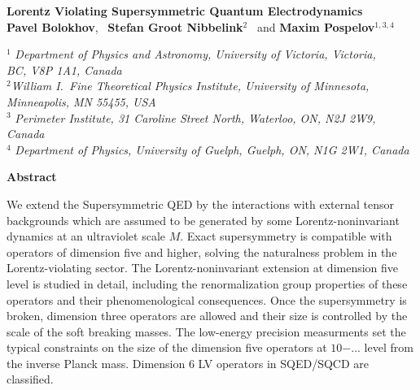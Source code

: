 \documentclass[12pt]{revtex4}
\begin{document}
\begin{titlepage}
\renewcommand{\thefootnote}{\fnsymbol{footnote}}

\begin{center}
\vspace{0.5cm}

\large {\bf Lorentz Violating Supersymmetric Quantum Electrodynamics}\\[3mm]
  
\vspace*{0.5cm}
\normalsize
{\bf Pavel Bolokhov}, ~{\bf Stefan Groot Nibbelink}$^{2}$%
\ and
{\bf Maxim Pospelov}$^{1,3,4}$%

\vspace*{0.5cm}
$^{1}$ {\it Department of Physics and Astronomy,
University of Victoria, Victoria,\\ BC, V8P 1A1, Canada}\\
$^{2}${\it William I.\ Fine Theoretical Physics Institute,
University of Minnesota,\\ Minneapolis, MN 55455, USA}\\
$^{3}$ {\it Perimeter Institute, 31 Caroline Street North,
Waterloo, ON,  N2J 2W9,
Canada}\\
$^{4}$ {\it Department of Physics,
 University of Guelph,
 Guelph, ON,  N1G 2W1, Canada}
 \end{center}

\centerline{\large\bf Abstract}
We extend the Supersymmetric QED by the interactions with external 
tensor backgrounds which are assumed to be generated by some Lorentz-noninvariant 
dynamics at an ultraviolet scale $M$. Exact supersymmetry is compatible with operators 
of dimension five and higher, solving the naturalness problem in the 
Lorentz-violating sector. The Lorentz-noninvariant extension at 
dimension five level is studied in detail, including the 
renormalization group properties of these 
operators and their phenomenological consequences. 
Once the supersymmetry is broken, dimension three operators are 
allowed and their size is controlled by the scale of the 
soft breaking masses. The low-energy precision measurments 
set the typical constraints on the size of the dimension 
five operators at $10{-...}$ level from the inverse Planck mass. 
Dimension 6 LV operators in SQED/SQCD are classified.



\end{titlepage}
\end{document}
